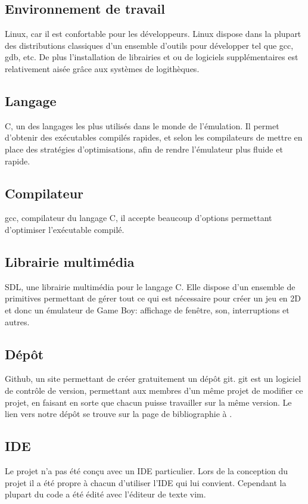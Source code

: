 \documentclass{report}
\begin{document}
\subsection{Environnement de travail}
Linux, car il est confortable pour les développeurs. Linux dispose dans la plupart des distributions classiques d'un ensemble d'outils pour développer tel que gcc, gdb, etc. De plus l'installation de librairies et ou de logiciels supplémentaires est relativement aisée grâce aux systèmes de logithèques.

\subsection{Langage}
C, un des langages les plus utilisés dans le monde de l'émulation. Il permet d'obtenir des exécutables compilés rapides, et selon les compilateurs de mettre en place des stratégies d'optimisations, afin de rendre l'émulateur plus fluide et rapide.

\subsection{Compilateur}
gcc, compilateur du langage C, il accepte beaucoup d'options permettant d'optimiser l'exécutable compilé.

\subsection{Librairie multimédia}
SDL, une librairie multimédia pour le langage C. Elle dispose d'un ensemble de primitives permettant de gérer tout ce qui est nécessaire pour créer un jeu en 2D et donc un émulateur de Game Boy: affichage de fenêtre, son, interruptions et autres.

\subsection{Dépôt}
Github, un site permettant de créer gratuitement un dépôt git. git est un logiciel de contrôle de version, permettant aux membres d'un même projet de modifier ce projet, en faisant en sorte que chacun puisse travailler sur la même version. Le lien vers notre dépôt se trouve sur la page de bibliographie à \cite{github}.

\subsection{IDE}
Le projet n'a pas été conçu avec un IDE particulier. Lors de la conception du projet il a été propre à chacun d'utiliser l'IDE qui lui convient. Cependant la plupart du code a été édité avec l'éditeur de texte vim.
\end{document}
